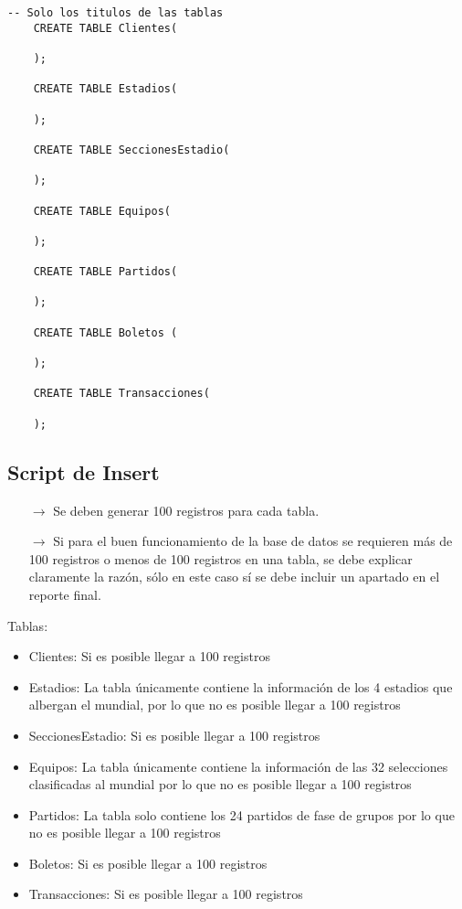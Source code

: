 \begin{lstlisting}[caption={Tablas para la BdDatos}, label={lst:sql_estadios}]
    -- Solo los titulos de las tablas    
    CREATE TABLE Clientes(

    );

    CREATE TABLE Estadios(

    );

    CREATE TABLE SeccionesEstadio(

    );

    CREATE TABLE Equipos(

    );

    CREATE TABLE Partidos(

    );

    CREATE TABLE Boletos (

    );

    CREATE TABLE Transacciones(

    );
\end{lstlisting}

    
\subsection{Script de Insert}
\begin{itemize}
    \item[$\rightarrow$] Se deben generar 100 registros para cada tabla.
    \item[$\rightarrow$] Si para el buen funcionamiento de la base de datos se requieren más de 100 registros o
            menos de 100 registros en una tabla, se debe explicar claramente la razón, sólo en este caso
            sí se debe incluir un apartado en el reporte final.
\end{itemize}

Tablas:
\begin{itemize}
    \item Clientes: Si es posible llegar a 100 registros 
    \item Estadios: La tabla únicamente contiene la información de los 4 estadios que albergan el mundial, por lo que no es posible llegar a 100 registros
    \item SeccionesEstadio: Si es posible llegar a 100 registros 
    \item Equipos: La tabla únicamente contiene la información de las 32 selecciones clasificadas al mundial por lo que no es posible llegar a 100 registros
    \item Partidos: La tabla solo contiene los 24 partidos de fase de grupos por lo que no es posible llegar a 100 registros
    \item Boletos: Si es posible llegar a 100 registros 
    \item Transacciones: Si es posible llegar a 100 registros 
\end{itemize}


